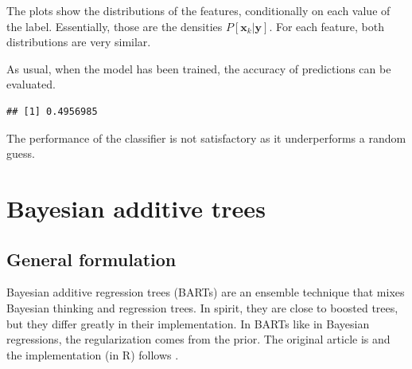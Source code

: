 \documentclass[]{krantz}
\makeatletter
\newenvironment{Shaded}{\begin{snugshade}}{\end{snugshade}}
\newcommand{\CommentTok}[1]{\textcolor[rgb]{0.37,0.37,0.37}{\textit{#1}}}
\newcommand{\DataTypeTok}[1]{\textcolor[rgb]{0.27,0.27,0.27}{#1}}
\newcommand{\FloatTok}[1]{\textcolor[rgb]{0.06,0.06,0.06}{#1}}
\newcommand{\KeywordTok}[1]{\textcolor[rgb]{0.27,0.27,0.27}{\textbf{#1}}}
\newcommand{\NormalTok}[1]{#1}
\newcommand{\OperatorTok}[1]{\textcolor[rgb]{0.43,0.43,0.43}{\textbf{#1}}}
\newcommand{\StringTok}[1]{\textcolor[rgb]{0.5,0.5,0.5}{#1}}
\newenvironment{kframe}{%
\medskip{}
\setlength{\fboxsep}{.8em}
 \def\at@end@of@kframe{}%
 \ifinner\ifhmode%
  \def\at@end@of@kframe{\end{minipage}}%
  \begin{minipage}{\columnwidth}%
 \fi\fi%
 \def\FrameCommand##1{\hskip\@totalleftmargin \hskip-\fboxsep
 \colorbox{shadecolor}{##1}\hskip-\fboxsep
     \hskip-\linewidth \hskip-\@totalleftmargin \hskip\columnwidth}%
 \MakeFramed {\advance\hsize-\width
   \@totalleftmargin\z@ \linewidth\hsize
   \@setminipage}}%
 {\par\unskip\endMakeFramed%
 \at@end@of@kframe}
\renewenvironment{Shaded}{\begin{kframe}}{\end{kframe}}
\theoremstyle{definition}
\theoremstyle{definition}
\theoremstyle{definition}
\theoremstyle{remark}
\makeatother
\begin{document}
The plots show the distributions of the features, conditionally on each
value of the label. Essentially, those are the densities
\(P[\textbf{x}_k| \textbf{y}]\). For each feature, both distributions
are very similar.

As usual, when the model has been trained, the accuracy of predictions
can be evaluated.

\footnotesize

\begin{Shaded}
\end{Shaded}

\begin{verbatim}
## [1] 0.4956985
\end{verbatim}

\normalsize

The performance of the classifier is not satisfactory as it
underperforms a random guess.

\hypertarget{BART}{%
\section{Bayesian additive trees}\label{BART}}

\hypertarget{general-formulation}{%
\subsection{General formulation}\label{general-formulation}}

Bayesian additive regression trees (BARTs) are an ensemble technique
that mixes Bayesian thinking and regression trees. In spirit, they are
close to boosted trees, but they differ greatly in their implementation.
In BARTs like in Bayesian regressions, the regularization comes from the
prior. The original article is \citet{chipman2010bart} and the
implementation (in R) follows \citet{sparapani2019r}.
\end{document}
